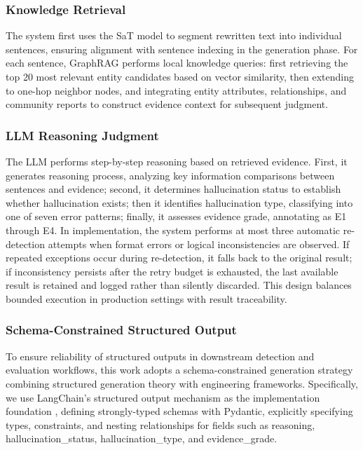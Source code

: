 \documentclass[11pt]{article}
\begin{document}
\subsubsection{Knowledge Retrieval}

The system first uses the SaT model \citep{frohmann2024segmentAnyText} to segment rewritten text into individual sentences, ensuring alignment with sentence indexing in the generation phase. For each sentence, GraphRAG performs local knowledge queries: first retrieving the top 20 most relevant entity candidates based on vector similarity, then extending to one-hop neighbor nodes, and integrating entity attributes, relationships, and community reports to construct evidence context for subsequent judgment.

\subsubsection{LLM Reasoning Judgment}

The LLM performs step-by-step reasoning based on retrieved evidence. First, it generates reasoning process, analyzing key information comparisons between sentences and evidence; second, it determines hallucination status to establish whether hallucination exists; then it identifies hallucination type, classifying into one of seven error patterns; finally, it assesses evidence grade, annotating as E1 through E4. In implementation, the system performs at most three automatic re-detection attempts when format errors or logical inconsistencies are observed. If repeated exceptions occur during re-detection, it falls back to the original result; if inconsistency persists after the retry budget is exhausted, the last available result is retained and logged rather than silently discarded. This design balances bounded execution in production settings with result traceability.

\subsubsection{Schema-Constrained Structured Output}

To ensure reliability of structured outputs in downstream detection and evaluation workflows, this work adopts a schema-constrained generation strategy combining structured generation theory with engineering frameworks. Specifically, we use LangChain's structured output mechanism as the implementation foundation \citep{chase2023langchain,langchain2024structuredOutput}, defining strongly-typed schemas with Pydantic, explicitly specifying types, constraints, and nesting relationships for fields such as reasoning, hallucination\_status, hallucination\_type, and evidence\_grade.
\end{document}
